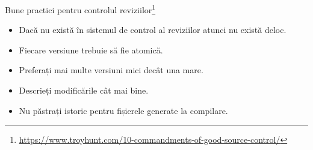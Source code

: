 \documentclass[presentation]{beamer}
\begin{document}
\begin{frame}[label={sec:orgc5d9264}]{Bune practici pentru controlul reviziilor\footnote{\url{https://www.troyhunt.com/10-commandments-of-good-source-control/}}}
\begin{itemize}
\item Dacă nu există în sistemul de control al reviziilor atunci nu există deloc.
\item Fiecare versiune trebuie să fie atomică.
\item Preferați mai multe versiuni mici decât una mare.
\item Descrieți modificările cât mai bine.
\item Nu păstrați istoric pentru fișierele generate la compilare.
\end{itemize}
\end{frame}
\end{document}
